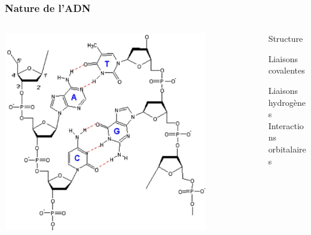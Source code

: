 \documentclass{beamer}
\begin{document}
 \frame %
{
  \frametitle{Nature de l'ADN}
  
  \begin{columns}
  \begin{column}{0.7\textwidth}
\begin{center}
\includegraphics[width=0.8\textwidth]{adn.jpg}
\end{center}
\end{column}

  \begin{column}{0.3\textwidth}
\begin{center}
Structure\\
\medskip

Liaisons covalentes\\
\medskip

Liaisons hydrogènes\\
\medskip
Interactions orbitalaires


\end{center}
\end{column}

\end{columns}

}
\frame
\end{document}
